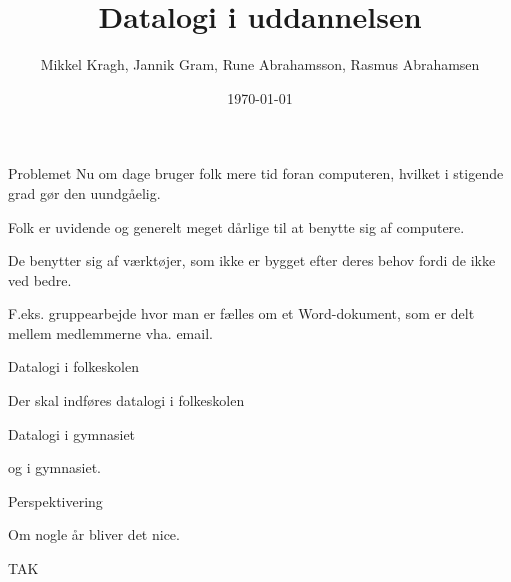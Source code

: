 \documentclass{beamer}
\title[Datalogi i uddannelsen]{Datalogi i uddannelsen}
\author{Mikkel Kragh, Jannik Gram, Rune Abrahamsson, Rasmus Abrahamsen}
\institute{DIKU}
\date{\today}
\begin{document}
\begin{frame}
\titlepage
\end{frame}


\begin{frame}{Problemet}
Nu om dage bruger folk mere tid foran computeren, hvilket i stigende grad gør den uundgåelig.

Folk er uvidende og generelt meget dårlige til at benytte sig af computere.

De benytter sig af værktøjer, som ikke er bygget efter deres behov fordi de ikke ved bedre.

F.eks. gruppearbejde hvor man er fælles om et Word-dokument, som er delt mellem medlemmerne vha. email.

\end{frame}

\begin{frame}{Datalogi i folkeskolen}

Der skal indføres datalogi i folkeskolen

\end{frame}

\begin{frame}{Datalogi i gymnasiet}

og i gymnasiet.

\end{frame}

\begin{frame}{Perspektivering}

Om nogle år bliver det nice.

\end{frame}

\begin{frame}{TAK}

\end{frame}
\end{document}

